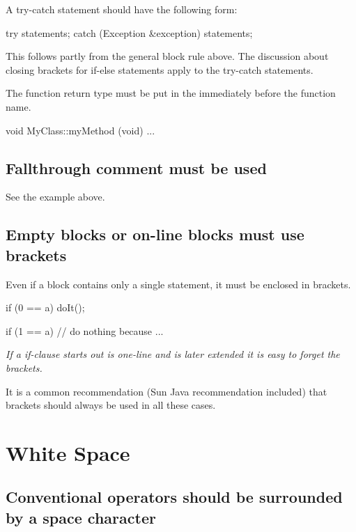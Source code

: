 \documentclass[a4paper,11pt,oneside]{scrbook}
\newcommand{\guideline}[1]{{\subsection{#1}}}
\newcommand{\motivation}[1]{{\normalfont \itshape #1}}
\newcommand{\trcode}[1]{{\normalfont \ttfamily #1}}
\begin{document}
A \trcode{try-catch} statement should have the following form: 

\begin{code}
  try {
    statements;
  }
  catch (Exception &exception) {
    statements;
  }
\end{code}

This follows partly from the general block rule above. The discussion about
closing brackets for \trcode{if-else} statements apply to the \trcode{try-catch}
statements.

The function return type must be put in the immediately before the function
name.

\begin{code}
  void MyClass::myMethod (void) {
    ...
  } 
\end{code}

\guideline{Fallthrough comment must be used}

See the example above.

\guideline{Empty blocks or on-line blocks must use brackets}

Even if a block contains only a single statement, it must be enclosed in
brackets.

\begin{code}
  if (0 == a) {
    doIt();
  }

  if (1 == a) {
    // do nothing because ...
  }
\end{code}

\motivation{
   If a if-clause starts out is one-line and is later extended it is easy to forget
   the brackets.

  It is a common recommendation (Sun Java recommendation included) that
  brackets should always be used in all these cases.
}

\section{White Space}

\guideline{Conventional operators should be surrounded by a space character}
\end{document}
